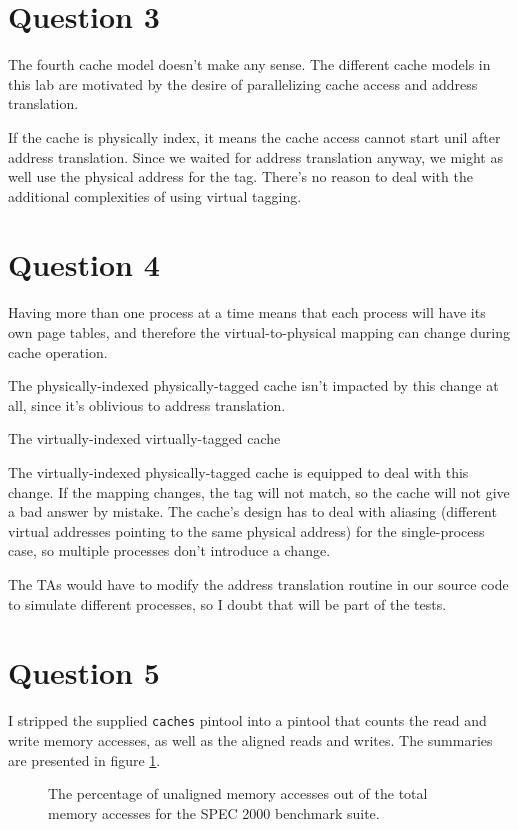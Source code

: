\section{Question 3}
The fourth cache model doesn't make any sense. The different cache models in
this lab are motivated by the desire of parallelizing cache access and address
translation.

If the cache is physically index, it means the cache access cannot start unil
after address translation. Since we waited for address translation anyway, we
might as well use the physical address for the tag. There's no reason to deal
with the additional complexities of using virtual tagging.

\section{Question 4}
Having more than one process at a time means that each process will have its
own page tables, and therefore the virtual-to-physical mapping can change
during cache operation.

The physically-indexed physically-tagged cache isn't impacted by this change at
all, since it's oblivious to address translation.

The virtually-indexed virtually-tagged cache 

The virtually-indexed physically-tagged cache is equipped to deal with this
change. If the mapping changes, the tag will not match, so the cache will not
give a bad answer by mistake. The cache's design has to deal with aliasing
(different virtual addresses pointing to the same physical address) for the
single-process case, so multiple processes don't introduce a change.

The TAs would have to modify the address translation routine in our source code
to simulate different processes, so I doubt that will be part of the tests. 

\section{Question 5}

I stripped the supplied \texttt{caches} pintool into a pintool that counts the
read and write memory accesses, as well as the aligned reads and writes. The
summaries are presented in figure \ref{q5:unaligned_accesses}.

\begin{figure}[htb]
\center

\caption{The percentage of unaligned memory accesses out of the total memory
accesses for the SPEC 2000 benchmark suite. }
\label{q5:unaligned_accesses}
\end{figure}

